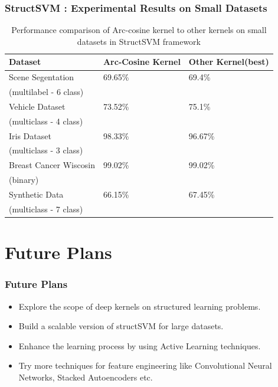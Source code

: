 \documentclass{beamer}
\begin{document}
\begin{frame}
\frametitle{StructSVM : Experimental Results on Small Datasets}
\begin{table}[htb]
\centering
\captionsetup{justification=centering}
\begin{tabular}{| l | l | l |}
\toprule
\textbf{Dataset} & \textbf{Arc-Cosine Kernel} & \textbf{Other Kernel(best)}\\
\midrule
Scene Segentation & 69.65\% & 69.4\% \\
(multilabel - 6 class) & & \\
\hline
Vehicle Dataset & 73.52\% & 75.1\% \\
(multiclass - 4 class) & & \\
\hline
Iris Dataset & 98.33\% & 96.67\% \\
(multiclass - 3 class) & & \\
\hline
Breast Cancer Wiscosin & 99.02\% & 99.02\% \\
(binary) & & \\
\hline
Synthetic Data & 66.15\% & 67.45\% \\
(multiclass - 7 class) & & \\
\bottomrule
\end{tabular}
\caption{Performance comparison of Arc-cosine kernel to other kernels on small datasets in StructSVM framework}
\end{table}
\end{frame}


\section{Future Plans}

\begin{frame}
\frametitle{Future Plans}
\begin{itemize}
\item Explore the scope of deep kernels on structured learning problems.

\item Build a scalable version of structSVM for large datasets.

\item Enhance the learning process by using Active Learning techniques.

\item Try more techniques for feature engineering like Convolutional Neural Networks, Stacked Autoencoders etc.
\end{itemize}

\end{frame}
\end{document}
